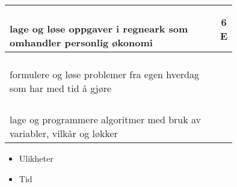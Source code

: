 \begin{center}
\begin{tabular}{p{10.5cm} | c | c |}
\shortstack[l]{\\lage og løse oppgaver i regneark som \\omhandler personlig økonomi
} &\shortstack{} &\shortstack{6\\E} \\ \hline

\shortstack[l]{\\formulere og løse problemer fra egen hverdag\\ som har med tid å gjøre
} &\shortstack{} &\shortstack{} \\ \hline

\shortstack[l]{\\lage og programmere algoritmer med bruk av \\variabler, vilkår og løkker
} &\shortstack{} &\shortstack{} \\ \hline
\end{tabular}

\begin{itemize}
	\item Ulikheter
	\item Tid
\end{itemize}
\end{center}

